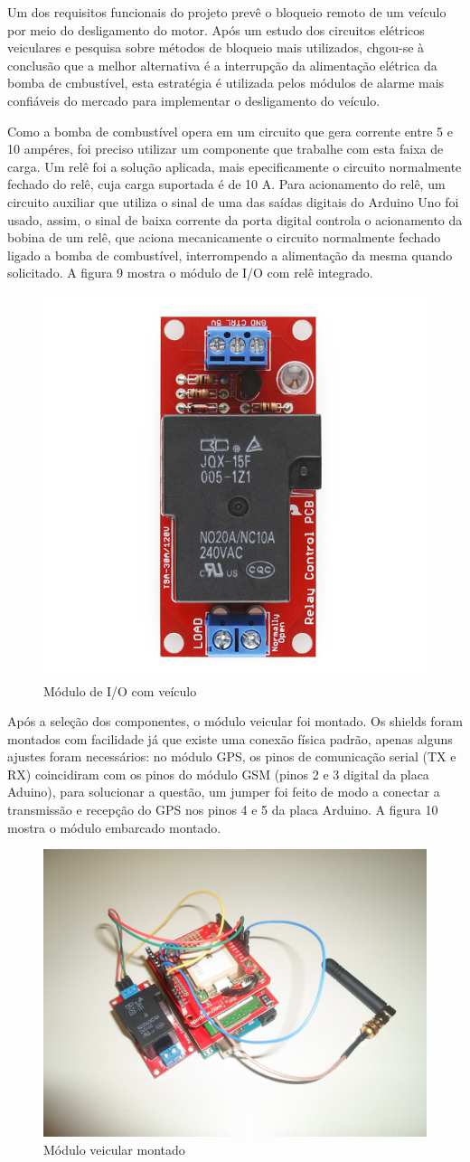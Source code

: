 Um dos requisitos funcionais do projeto prevê o bloqueio remoto de um veículo por meio do desligamento 
do motor. Após um estudo dos circuitos elétricos veiculares e pesquisa sobre métodos de bloqueio mais
utilizados, chgou-se à conclusão que a melhor alternativa é a interrupção da alimentação elétrica
da bomba de cmbustível, esta estratégia é utilizada pelos módulos de alarme mais confiáveis do mercado
para implementar o desligamento do veículo.

Como a bomba de combustível opera em um circuito que gera corrente entre 5 e 10 ampéres, foi preciso
utilizar um componente que trabalhe com esta faixa de carga. Um relê foi a solução aplicada, mais epecificamente
o circuito normalmente fechado do relê, cuja carga suportada é de 10 A. Para acionamento do relê, um circuito
auxiliar que utiliza o sinal de uma das saídas digitais do Arduino Uno foi usado, assim, o sinal de baixa corrente
da porta digital controla o acionamento da bobina de um relê, que aciona mecanicamente o circuito normalmente fechado
ligado a bomba de combustível, interrompendo a alimentação da mesma quando solicitado. A figura 9 mostra o módulo de
I/O com relê integrado.

\begin{figure}[!htb]
	\centering
	\includegraphics[width=5.00cm\textwidth]{figures/beefcake2.jpg}
	\caption{Módulo de I/O com veículo}
	\label{Figura 9}
\end{figure}

Após a seleção dos componentes, o módulo veicular foi montado. Os shields foram montados com facilidade já que
existe uma conexão física padrão, apenas alguns ajustes foram necessários: no módulo GPS, os pinos de comunicação
serial (TX e RX) coincidiram com os pinos do módulo GSM (pinos 2 e 3 digital da placa Aduino), para solucionar
a questão, um jumper foi feito de modo a conectar a transmissão e recepção do GPS nos pinos 4 e 5 da placa Arduino.
A figura 10 mostra o módulo embarcado montado.

\begin{figure}[!htb]
	\centering
	\includegraphics[width=5.00cm\textwidth]{figures/prototipo_4.jpg}
	\caption{Módulo veicular montado}
	\label{Figura 10}
\end{figure}

